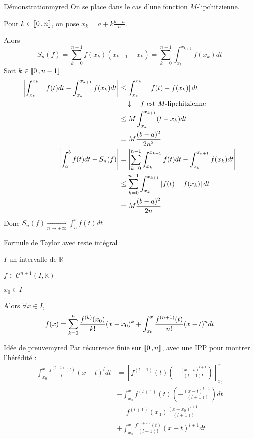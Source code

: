     \begin{demo}{Démonstration}{myred}
        On se place dans le cas d’une fonction $M$-lipchitzienne.
        
        Pour $k \in \left\llbracket 0 \, , n \right\rrbracket$, on pose $x_k = a + k \frac{b-a}{n}$.
        
        Alors \[ S_n(f) = \sum\limits_{k=0}^{n-1} f(x_k)(x_{k+1}-x_k) = \sum\limits_{k=0}^{n-1} \int_{x_k}^{x_{k+1}} f(x_k)dt \] 
        Soit $k \in \left\llbracket 0 \, , n-1 \right\rrbracket$
        \begin{align*}
            \left\lvert \int_{x_k}^{x_{k+1}} f(t)dt - \int_{x_k}^{x_{k+1}} f(x_k)dt\right\rvert & \leq \int_{x_k}^{x_{k+1}} \left\lvert f(t) - f(x_k)\right\rvert dt \\
            & \quad \downarrow \quad f \text{ est } M\text{-lipchitzienne} \\
            & \leq M \int_{x_{k}}^{x_{k+1}} (t-x_k) dt \\
            & = M \frac{(b-a)^2}{2n^2} \\
            \left\lvert \int_{a}^{b} f(t)dt - S_n(f)\right\rvert &= \left\lvert \sum\limits_{k=0}^{n-1} \int_{x_k}^{x_{k+1}} f(t)dt - \int_{x_k}^{x_{k+1}} f(x_k)dt\right\rvert \\
            & \leq \sum\limits_{k=0}^{n-1} \int_{x_k}^{x_{k+1}} \left\lvert f(t) - f(x_k)\right\rvert dt \\
            & = M \frac{(b-a)^2}{2n}
        \end{align*}
        Donc $S_n(f) \underset{n \rightarrow +\infty}{\longrightarrow} \int_{a}^{b} f(t)dt$
    \end{demo}

    \begin{theo}{Formule de Taylor avec reste intégral}{}
        \begin{soient}
            \item $I$ un intervalle de $\mathbb{R}$
            \item $f \in \mathcal{C}^{n+1}(I,\mathbb{K})$
            \item $x_0 \in I$
        \end{soient}
        Alors $\forall x \in I$, 
        \[  f(x) = \sum\limits_{k=0}^n \frac{f^{(k)}(x_0)}{k!}(x-x_0)^k \\ + \int_{x_0}^{x} \frac{f^{(n+1)}(t)}{n!}(x-t)^ndt  \]
    \end{theo}

    \begin{demo}{Idée de preuve}{myred}
        Par récurrence finie sur $\left\llbracket 0 \, , n \right\rrbracket$, avec une IPP pour montrer l’hérédité : 
        \begin{align*}
            \int_{x_0}^{x} \frac{f^{(l+1)}(t)}{l!} (x-t)^l dt &= \left[ f^{(l+1)}(t) \left(-\frac{(x-t)^{l+1}}{(l+1)!}\right)\right]_{x_0}^x \\
            &- \int_{x_0}^{x} f^{(l+1)}(t) \left(-\frac{(x-t)^{l+1}}{(l+1)!}\right)dt \\
            &= f^{(l+1)}(x_0) \frac{(x-x_0)^{l+1}}{(l+1)!} \\
            &+  \int_{x_0}^{x} \frac{f^{(l+2)}(t)}{(l+1)!} (x-t)^{l+1} dt 
        \end{align*}
    \end{demo}

